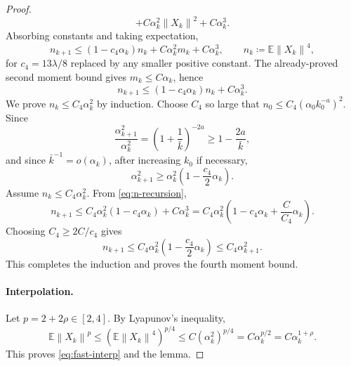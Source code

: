 \documentclass[10pt,a4paper]{amsart}
\newcommand{\E}{\mathbb{E}}
\newcommand{\norm}[1]{\left\lVert #1\right\rVert}
\begin{document}
\begin{proof}
\[       +C\alpha_k^2\norm{X_k}^2+C\alpha_k^3.
\]
Absorbing constants and taking expectation,
\begin{equation}
  n_{k+1}\le(1-c_4\alpha_k)n_k+C\alpha_k^2m_k+C\alpha_k^3,
  \qquad n_k\coloneqq\E\norm{X_k}^4, \label{eq:n-recursion-pre}
\end{equation}
for $c_4=13\lambda/8$ replaced by any smaller positive constant. The already-proved second moment bound gives $m_k\le C\alpha_k$, hence
\begin{equation}
  n_{k+1}\le(1-c_4\alpha_k)n_k+C\alpha_k^3. \label{eq:n-recursion}
\end{equation}
We prove $n_k\le C_4\alpha_k^2$ by induction. Choose $C_4$ so large that $n_0\le C_4(\alpha_0 k_0^{-a})^2$. Since
\[
  \frac{\alpha_{k+1}^2}{\alpha_k^2}=\left(1+\frac1{\bar k}\right)^{-2a}
  \ge1-\frac{2a}{\bar k},
\]
and since $\bar k^{-1}=o(\alpha_k)$, after increasing $k_0$ if necessary,
\begin{equation}
  \alpha_{k+1}^2\ge \alpha_k^2\left(1-\frac{c_4}{2}\alpha_k\right). \label{eq:alpha2-compare}
\end{equation}
Assume $n_k\le C_4\alpha_k^2$. From \eqref{eq:n-recursion},
\[
  n_{k+1}\le C_4\alpha_k^2(1-c_4\alpha_k)+C\alpha_k^3
  =C_4\alpha_k^2\left(1-c_4\alpha_k+\frac{C}{C_4}\alpha_k\right).
\]
Choosing $C_4\ge 2C/c_4$ gives
\[
  n_{k+1}\le C_4\alpha_k^2\left(1-\frac{c_4}{2}\alpha_k\right)
  \le C_4\alpha_{k+1}^2.
\]
This completes the induction and proves the fourth moment bound.

\paragraph{Interpolation.}
Let $p=2+2\rho\in[2,4]$. By Lyapunov's inequality,
\[
  \E\norm{X_k}^p\le \left(\E\norm{X_k}^4\right)^{p/4}
  \le C\left(\alpha_k^2\right)^{p/4}
  =C\alpha_k^{p/2}
  =C\alpha_k^{1+\rho}.
\]
This proves \eqref{eq:fast-interp} and the lemma.
\end{proof}
\end{document}
